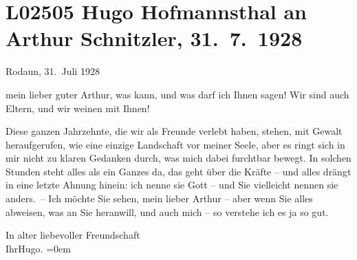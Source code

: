 

\section[Hugo Hofmannsthal an Arthur Schnitzler, 31. 7. 1928]{L02505 Hugo Hofmannsthal an Arthur Schnitzler, 31. 7. 1928}
\nopagebreak{}
\rehead{ }\normalsize\beginnumbering{}
\toendnotes[C]{\smallbreak\pagebreak[2]}\toendnotes[C]{\smallbreak}
\pstart
           \raggedleft{}{\pb}Rodaun, 31. Juli 1928\pend
           
\pstart{}mein lieber guter Arthur, \pend\vspace{0.5em}
\pstart
           was kann, und was darf ich Ihnen sagen! Wir sind auch Eltern, und wir weinen mit Ihnen! \pend
           
\pstart
           Diese ganzen Jahrzehnte, die wir als Freunde verlebt haben, stehen, mit Gewalt
               heraufgerufen, wie eine einzige Landschaft vor meiner Seele, aber es ringt sich in
               mir nicht zu klaren Gedanken durch, was mich dabei furchtbar bewegt. In solchen
               Stunden steht alles als ein Ganzes da, das geht über die Kräfte – und alles drängt in
               eine letzte Ahnung hinein: ich nenne sie Gott – und Sie vielleicht nennen sie
               anders. – Ich möchte Sie sehen, mein lieber Arthur – aber wenn Sie alles abweisen,
               was an Sie heranwill, und auch mich – so verstehe ich es ja so gut.\pend
           
\pstart
           In alter liebevoller Freundschaft{\\[\baselineskip]}Ihr\spacefill\mbox{Hugo.}\pend
           \leftskip=0em{}\endnumbering{}  
      